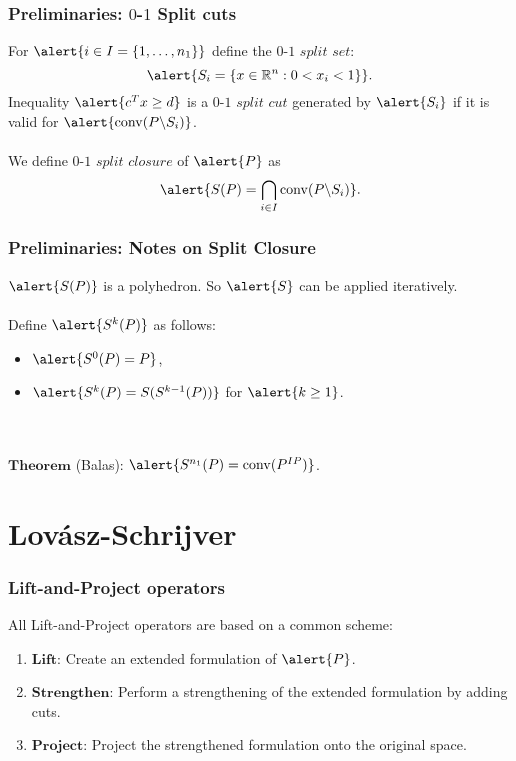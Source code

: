 \documentclass{beamer}
\DeclareMathOperator{\conv}{conv}
\begin{document}
\begin{frame}
\frametitle{Preliminaries: $0$-$1$ Split cuts}
 For $\alert{i \in I = \{1, \dots, n_1\}}$ define the $0$-$1$ $\textit{split set}$:
 $$\alert{S_i = \{x \in \R^n : 0 < x_i < 1\}}.$$
 Inequality $\alert{c^Tx \geq d}$ is a $0$-$1$ $\textit{split cut}$ generated by $\alert{S_i}$ if it is valid for $\alert{\conv(P\backslash S_i)}$.
 \\\ \\
 We define $0$-$1$ $\textit{split closure}$ of $\alert{P}$ as
 $$\alert{S(P) = \bigcap_{i \in I} \conv(P \backslash S_i)}.$$
\end{frame}

\begin{frame}
\frametitle{Preliminaries: Notes on Split Closure}
$\alert{S(P)}$ is a polyhedron. So $\alert{S}$ can be applied iteratively.
\\\ \\
Define $\alert{S^k(P)}$ as follows:
\begin{itemize}
\item $\alert{S^0(P) = P}$,
\item $\alert{S^k(P) = S(S^{k-1}(P))}$ for $\alert{k \geq 1}$.
\end{itemize}\ \\\ \\
$\textbf{Theorem}$ (Balas): $\alert{S^{n_1}(P) = \conv(P^{IP})}$.
\end{frame}

\section{Lov\'asz-Schrijver}

\begin{frame}
\frametitle{Lift-and-Project operators}
All Lift-and-Project operators are based on a common scheme:
\begin{enumerate}
\item $\textbf{Lift:}$ Create an extended formulation of $\alert{P}$.
\item $\textbf{Strengthen:}$ Perform a strengthening of the extended formulation by adding cuts.
\item $\textbf{Project:}$ Project the strengthened formulation onto the original space.
\end{enumerate}
\end{frame}
\end{document}
